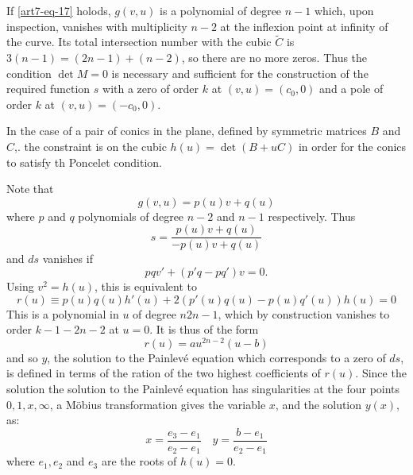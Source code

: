 If \eqref{art7-eq-17} holods, $g(v,u)$ is a polynomial of degree $n-1$ which, upon inspection, vanishes with multiplicity $n-2$ at the inflexion point at infinity of the curve. Its total intersection number with the cubic $\tilde{C}$ is $3(n-1) = (2n-1)+(n-2)$, so there are no more zeros. Thus the condition $\det M =0 $ is necessary and sufficient for the construction of the required function $s$ with a zero of order $k$ at $(v, u)=(c_{0},0)$ and a pole of order $k$ at $(v,u)= (-c_{0},0)$.

In the case of a pair of conics in the plane, defined by symmetric matrices $B$ and $C$,. the constraint is on the cubic $h(u)=\det(B+uC)$ in order for the conics to satisfy th Poncelet condition.

Note that
$$
g(v,u) = p(u)v +q(u)
$$
where $p$ and $q$ polynomials of degree $n-2$ and $n-1$ respectively. Thus
$$
s = \dfrac{p(u)v + q(u)}{-p(u)v + q(u)}
$$
and $ds$ vanishes if
$$
pqv' + (p'q-pq')v=0.
$$
Using $v^{2}=h(u)$, this is equivalent to
$$
r(u)\equiv p(u)q(u)h'(u) + 2(p'(u)q(u)-p(u)q'(u))h(u)=0
$$
This is a polynomial in $u$ of degree $n2n-1$, which by construction vanishes to order $k-1-2n-2$ at $u =0$. It is thus of the form
$$
r(u)=au^{2n-2}(u-b)
$$
and so $y$, the solution to the Painlev\'e equation which corresponds to a zero
 of $ds$, is defined in terms of the ration of the two highest coefficients of $r(u)$. Since the solution the solution to the Painlev\'e equation has singularities at the four points $0,1,x, \infty$, a M\"obius transformation gives the variable $x$, and the solution $y(x)$, as:
 \begin{equation}\label{art7-eq-18}
x= \dfrac{e_{3}-e_{1}}{e_{2}-e_{1}} \quad y=\dfrac{b-e_{1}}{e_{2}-e_{1}}
 \end{equation}   
where $e_{1}, e_{2}$ and $e_{3}$ are the roots of $h(u)=0$.


